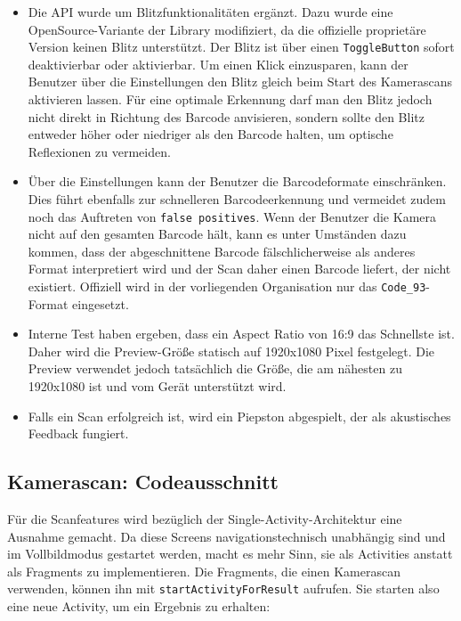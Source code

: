 \begin{itemize}
\tightlist
\item
  Die API wurde um Blitzfunktionalitäten ergänzt. Dazu wurde eine
  OpenSource-Variante der Library modifiziert, da die offizielle
  proprietäre Version keinen Blitz unterstützt. Der Blitz ist über einen
  \texttt{ToggleButton} sofort deaktivierbar oder aktivierbar. Um einen
  Klick einzusparen, kann der Benutzer über die Einstellungen den Blitz
  gleich beim Start des Kamerascans aktivieren lassen. Für eine optimale
  Erkennung darf man den Blitz jedoch nicht direkt in Richtung des
  Barcode anvisieren, sondern sollte den Blitz entweder höher oder
  niedriger als den Barcode halten, um optische Reflexionen zu
  vermeiden.
\item
  Über die Einstellungen kann der Benutzer die Barcodeformate
  einschränken. Dies führt ebenfalls zur schnelleren Barcodeerkennung
  und vermeidet zudem noch das Auftreten von \texttt{false\ positives}.
  Wenn der Benutzer die Kamera nicht auf den gesamten Barcode hält, kann
  es unter Umständen dazu kommen, dass der abgeschnittene Barcode
  fälschlicherweise als anderes Format interpretiert wird und der Scan
  daher einen Barcode liefert, der nicht existiert. Offiziell wird in
  der vorliegenden Organisation nur das \texttt{Code\_93}-Format
  eingesetzt.
\item
  Interne Test haben ergeben, dass ein Aspect Ratio von 16:9 das
  Schnellste ist. Daher wird die Preview-Größe statisch auf 1920x1080
  Pixel festgelegt. Die Preview verwendet jedoch tatsächlich die Größe,
  die am nähesten zu 1920x1080 ist und vom Gerät unterstützt wird.
\item
  Falls ein Scan erfolgreich ist, wird ein Piepston abgespielt, der als
  akustisches Feedback fungiert.
\end{itemize}

\hypertarget{kamerascan-codeausschnitt}{%
\subsection{Kamerascan:
Codeausschnitt}\label{kamerascan-codeausschnitt}}

Für die Scanfeatures wird bezüglich der Single-Activity-Architektur eine
Ausnahme gemacht. Da diese Screens navigationstechnisch unabhängig sind
und im Vollbildmodus gestartet werden, macht es mehr Sinn, sie als
Activities anstatt als Fragments zu implementieren. Die Fragments, die
einen Kamerascan verwenden, können ihn mit
\texttt{startActivityForResult} aufrufen. Sie starten also eine neue
Activity, um ein Ergebnis zu erhalten:

